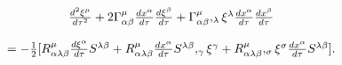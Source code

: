 \begin{equation}
\begin{array}{c}
\frac{d^{2}\xi ^{\mu }}{d\tau ^{2}}+2\Gamma _{\alpha \beta }^{\mu }\frac{%
dx^{\alpha }}{d\tau }\frac{d\xi ^{\beta }}{d\tau }+\Gamma _{\alpha \beta
}^{\mu },_{\lambda }\xi ^{\lambda }\frac{dx^{\alpha }}{d\tau }\frac{%
dx^{\beta }}{d\tau } \\ 
\\ 
=-\frac{1}{2}[R_{\alpha \lambda \beta }^{\mu }\frac{d\xi ^{\alpha }}{d\tau }%
S^{\lambda \beta }+R_{\alpha \lambda \beta }^{\mu }\frac{dx^{\alpha }}{d\tau 
}S^{\lambda \beta },_{\gamma }\xi ^{\gamma }+R_{\alpha \lambda \beta }^{\mu
},_{\sigma }\xi ^{\sigma }\frac{dx^{\alpha }}{d\tau }S^{\lambda \beta }].
\end{array}
\label{21}
\end{equation}

